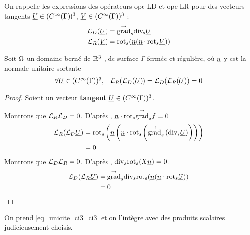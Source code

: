 On rappelle les expressions des opérateurs \gls{ope-LD} et \gls{ope-LR} pour des vecteurs tangents $\v U \in (C^\infty(\Gamma))^3$, $ \v V \in (C^\infty(\Gamma))^3$ :
\begin{align*}
\LD(\v U) &= \tgrads \tdivs \v U\\
\LR(\v V) &= \trots( \n ( \n \cdot \trots \v V))\\
\end{align*}
\begin{prop}
Soit $\O$ un domaine borné de $\R^3$ , de surface $\Gamma$ fermée et régulière, où $\v n$ y est la normale unitaire
sortante
\begin{equation}
\begin{matrix}
\forall \v U \in (C^\infty(\Gamma))^3 ,& \LR(\LD(\v U)) = \LD(\LR(\v U)) = 0
\end{matrix}
\end{equation}
\end{prop}
\begin{proof}
Soient un vecteur \textbf{tangent} $\v U \in (C^\infty(\Gamma))^3$.

Montrons que $\LR\LD = 0$. D’après \cite[p.~1029, A3.42]{bladel_electromagnetic_2007}, $\n \cdot \trots\tgrads f = 0$
\begin{align*}
\LR(\LD \v U)  &= \trots \left(\n \left(\n \cdot \trots \left( \tgrads \left(\tdivs \v U\right)\right)\right)\right) \\
&= 0
\end{align*}
Montrons que $\LD\LR = 0$. D’après \cite[p.~1029, A3.43]{bladel_electromagnetic_2007}, $\tdivs \trots (X\n) = 0$.
\begin{align*}
\LD(\LR \v U) &= \tgrads \tdivs \trots (\n (\n \cdot \trots \v U)) \\
&= 0
\end{align*}
\end{proof}


On prend \eqref{eq_unicite_ci3_ci3} et on l’intègre avec des produits scalaires judicieusement choisis.

